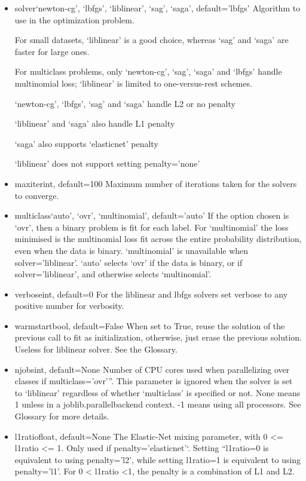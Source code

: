 \documentclass[12pt]{article}
\begin{document}
\begin{itemize}
\item
solver{‘newton-cg’, ‘lbfgs’, ‘liblinear’, ‘sag’, ‘saga’}, default=’lbfgs’
Algorithm to use in the optimization problem.

For small datasets, ‘liblinear’ is a good choice, whereas ‘sag’ and ‘saga’ are faster for large ones.

For multiclass problems, only ‘newton-cg’, ‘sag’, ‘saga’ and ‘lbfgs’ handle multinomial loss; ‘liblinear’ is limited to one-versus-rest schemes.

‘newton-cg’, ‘lbfgs’, ‘sag’ and ‘saga’ handle L2 or no penalty

‘liblinear’ and ‘saga’ also handle L1 penalty

‘saga’ also supports ‘elasticnet’ penalty

‘liblinear’ does not support setting penalty='none'


\item
max\textunderscore iterint, default=100
Maximum number of iterations taken for the solvers to converge.

\item
multi\textunderscore class{‘auto’, ‘ovr’, ‘multinomial’}, default=’auto’
If the option chosen is ‘ovr’, then a binary problem is fit for each label. For ‘multinomial’ the loss minimised is the multinomial loss fit across the entire probability distribution, even when the data is binary. ‘multinomial’ is unavailable when solver=’liblinear’. ‘auto’ selects ‘ovr’ if the data is binary, or if solver=’liblinear’, and otherwise selects ‘multinomial’.

\item
verboseint, default=0
For the liblinear and lbfgs solvers set verbose to any positive number for verbosity.

\item
warm\textunderscore startbool, default=False
When set to True, reuse the solution of the previous call to fit as initialization, otherwise, just erase the previous solution. Useless for liblinear solver. See the Glossary.

\item
n\textunderscore jobsint, default=None
Number of CPU cores used when parallelizing over classes if multi\textunderscore class=’ovr’”. This parameter is ignored when the solver is set to ‘liblinear’ regardless of whether ‘multi\textunderscore class’ is specified or not. None means 1 unless in a joblib.parallel\textunderscore backend context. -1 means using all processors. See Glossary for more details.

\item
l1\textunderscore ratiofloat, default=None
The Elastic-Net mixing parameter, with 0 <= l1\textunderscore ratio <= 1. Only used if penalty='elasticnet'`. Setting ``l1\textunderscore ratio=0 is equivalent to using penalty='l2', while setting l1\textunderscore ratio=1 is equivalent to using penalty='l1'. For 0 < l1\textunderscore ratio <1, the penalty is a combination of L1 and L2.
\end{itemize}
\end{document}
